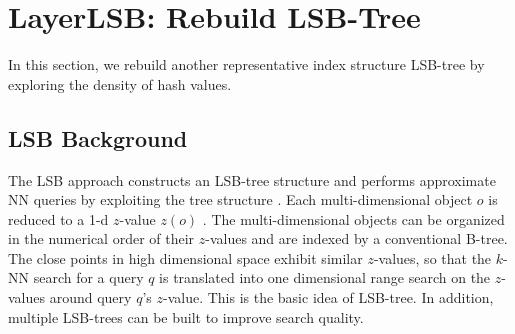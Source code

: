 \section{LayerLSB: Rebuild LSB-Tree}
\label{sec:reclsb}

In this section, we rebuild another representative index structure LSB-tree by exploring the density of hash values.


\subsection{LSB Background}
\label{sec:reclsb:review}

The LSB approach constructs an LSB-tree structure and performs approximate NN queries by exploiting the tree structure \cite{lsb}. Each multi-dimensional object $o$ is reduced to a 1-d $z$-value $z(o)$ \cite{Gaede:1998:MAM:280277.280279}. The multi-dimensional objects can be organized in the numerical order of their $z$-values and are indexed by a conventional B-tree. The close points in high dimensional space exhibit similar $z$-values, so that the $k$-NN search for a query $q$ is translated into one dimensional range search on the $z$-values around query $q$'s $z$-value. This is the basic idea of LSB-tree. In addition, multiple LSB-trees can be built to improve search quality.



